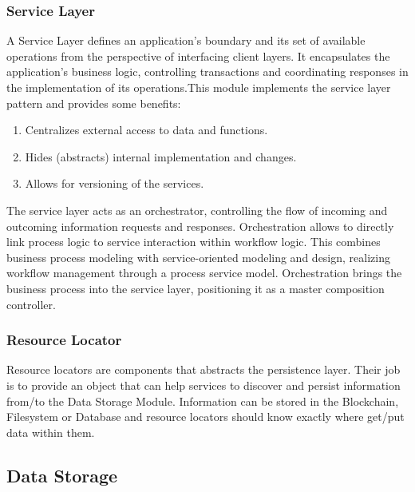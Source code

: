 \subsubsection{Service Layer}\label{sec:ServiceLayer}
A Service Layer defines an application's boundary and its set of available operations from the perspective of interfacing client layers. It encapsulates the application's business logic, controlling transactions and coordinating responses in the implementation of its operations.This module implements the service layer pattern and provides some benefits:

\begin{enumerate}
\item Centralizes external access to data and functions.
\item Hides (abstracts) internal implementation and changes.
\item Allows for versioning of the services.
\end{enumerate}

The service layer acts as an orchestrator, controlling the flow of incoming and outcoming information requests and responses. Orchestration allows to directly link process logic to service interaction within workflow logic. This combines business process modeling with service-oriented modeling and design, realizing workflow management through a process service model. Orchestration brings the business process into the service layer, positioning it as a master composition controller.

\subsubsection{Resource Locator}\label{sec:ResourceLocator}

Resource locators are components that abstracts the persistence layer. Their job is to provide an object that can help services to discover and persist information from/to the Data Storage Module. Information can be stored in the Blockchain, Filesystem or Database and resource locators should know exactly where get/put data within them.

\subsection{Data Storage}\label{sec:DataStorage}

